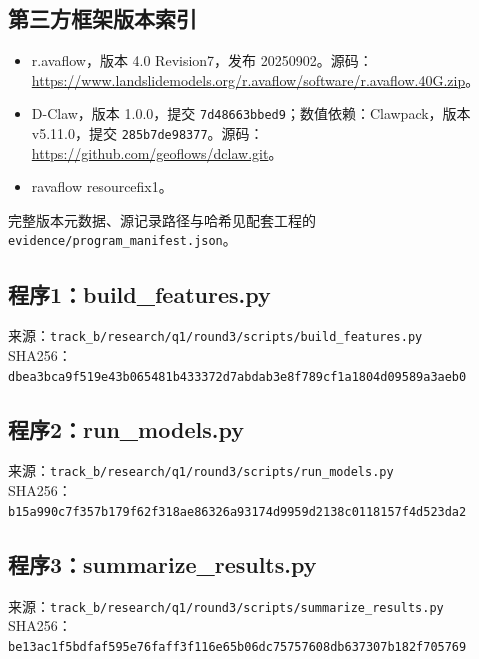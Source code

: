 \subsection*{第三方框架版本索引}
\begin{itemize}
\item r.avaflow，版本 4.0 Revision7，发布 20250902。源码：\url{https://www.landslidemodels.org/r.avaflow/software/r.avaflow.40G.zip}。
\item D-Claw，版本 1.0.0，提交 \texttt{7d48663bbed9}；数值依赖：Clawpack，版本 v5.11.0，提交 \texttt{285b7de98377}。源码：\url{https://github.com/geoflows/dclaw.git}。
\item ravaflow resourcefix1。
\end{itemize}
完整版本元数据、源记录路径与哈希见配套工程的\nolinkurl{evidence/program_manifest.json}。
\clearpage
\subsection*{程序1：build\_features.py}
\noindent 来源：\nolinkurl{track_b/research/q1/round3/scripts/build_features.py}\\
\noindent SHA256：\texttt{dbea3bca9f519e43b065481b433372d7}\allowbreak\texttt{abdab3e8f789cf1a1804d09589a3aeb0}\\
\clearpage
\subsection*{程序2：run\_models.py}
\noindent 来源：\nolinkurl{track_b/research/q1/round3/scripts/run_models.py}\\
\noindent SHA256：\texttt{b15a990c7f357b179f62f318ae86326a}\allowbreak\texttt{93174d9959d2138c0118157f4d523da2}\\
\clearpage
\subsection*{程序3：summarize\_results.py}
\noindent 来源：\nolinkurl{track_b/research/q1/round3/scripts/summarize_results.py}\\
\noindent SHA256：\texttt{be13ac1f5bdfaf595e76faff3f116e65}\allowbreak\texttt{b06dc75757608db637307b182f705769}\\
\clearpage
